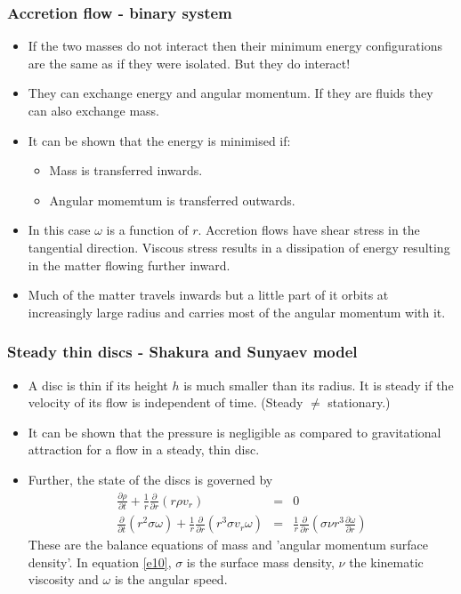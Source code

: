 \documentclass{beamer}
\newcommand{\pdt}[2]{\frac{\partial{#1}}{\partial{#2}}}	%
\begin{document}
\begin{frame}
\frametitle{Accretion flow - binary system}
\begin{itemize}
\item If the two masses do not interact then their minimum energy configurations are the same as if they were isolated. But they do interact!
\item They can exchange energy and angular momentum. If they are fluids they can also exchange mass.
\item It can be shown that the energy is minimised if:
\begin{itemize}
\item Mass is transferred inwards.
\item Angular momemtum is transferred outwards.
\end{itemize}
\item In this case $\omega$ is a function of $r$. Accretion flows have shear stress in the tangential direction. Viscous stress results in a dissipation of energy
resulting in the matter flowing further inward. 
\item Much of the matter travels inwards but a little part of it orbits at increasingly large radius and carries most of the angular momentum with it.
\end{itemize}
\end{frame}

\begin{frame}
\frametitle{Steady thin discs - Shakura and Sunyaev model}
\begin{itemize}
\item A disc is thin if its height $h$ is much smaller than its radius. It is steady if the velocity of its flow is independent of time. (Steady $\ne$ stationary.)
\item It can be shown that the pressure is negligible as compared to gravitational attraction for a flow in a steady, thin disc.
\item Further, the state of the discs is governed by
\begin{eqnarray}
\pdt{\rho}{t} + \frac{1}{r}\frac{\partial}{\partial r}(r\rho v_r)  &=&  0 \label{e9} \\
\frac{\partial}{\partial t}(r^2\sigma\omega) + \frac{1}{r}\frac{\partial}{\partial r}(r^3\sigma v_r\omega) &=&
\frac{1}{r}\frac{\partial}{\partial r}\left(\sigma\nu r^3\pdt{\omega}{r}\right) \label{e10}
\end{eqnarray}
These are the balance equations of mass and 'angular momentum surface density'. In equation \eqref{e10}, $\sigma$ is the surface mass density, $\nu$ the 
kinematic viscosity and $\omega$ is the angular speed.
\end{itemize}
\end{frame}
\end{document}
